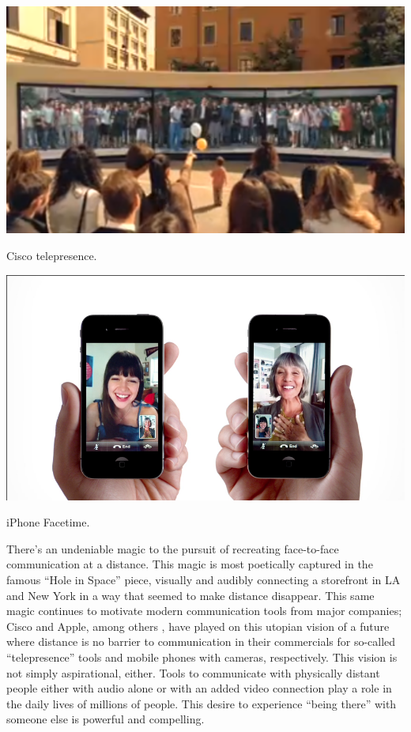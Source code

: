 \documentclass{tufte-handout}
\begin{document}
\begin{marginfigure}
	\includegraphics{figures/cisco-telepresence.png}
	\caption{Cisco telepresence.}
	\label{fig:cisco-telepresence}
\end{marginfigure}

\begin{marginfigure}
	\includegraphics{figures/iphone-face-to-face.png}
	\caption{iPhone Facetime.}
	\label{fig:facetime}
\end{marginfigure}



There's an undeniable magic to the pursuit of recreating face-to-face communication at a distance. This magic is most poetically captured in the famous ``Hole in Space'' \citet{hole_in_space} piece, visually and audibly connecting a storefront in LA and New York in a way that seemed to make distance disappear. This same magic continues to motivate modern communication tools from major companies; Cisco and Apple, among others \citet{commercials}, have played on this utopian vision of a future where distance is no barrier to communication in their commercials for so-called ``telepresence'' tools and mobile phones with cameras, respectively. This vision is not simply aspirational, either. Tools to communicate with physically distant people either with audio alone or with an added video connection play a role in the daily lives of millions of people. This desire to experience ``being there'' with someone else is powerful and compelling. 
\end{document}
